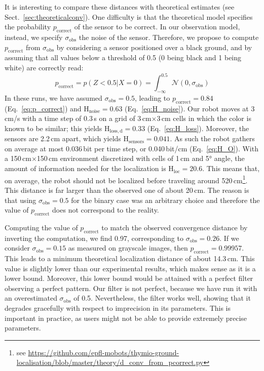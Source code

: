 \documentclass{svmult}
\newcommand{\sect}[1]{Sect.~\ref{sec:#1}}
\newcommand{\eq}[1]{Eq.~\ref{eq:#1}}
\newcommand{\ent}[1]{\mathrm{H}_\mathrm{#1}} %
\begin{document}
It is interesting to compare these distances with theoretical estimates (see \sect{theoreticalconv}).
One difficulty is that the theoretical model specifies the probability $p_\mathrm{correct}$ of the sensor to be correct.
In our observation model, instead, we specify $\sigma_\mathrm{obs}$ the noise of the sensor.
Therefore, we propose to compute $p_\mathrm{correct}$ from $\sigma_\mathrm{obs}$ by considering a sensor positioned over a black ground, and by assuming that all values below a threshold of 0.5 (0 being black and 1 being white) are correctly read:
\begin{equation} \label{eq:p_correct}
p_\mathrm{correct} = p(Z<0.5|X=0) = \int_{-\infty}^{0.5} \mathcal{N}(0, \sigma_\mathrm{obs})
\end{equation}
In these runs, we have assumed $\sigma_\mathrm{obs} = 0.5$, leading to $p_\mathrm{correct}=0.84$ (\eq{p_correct}) and $\ent{noise}=0.63$ (\eq{H_noise}).
Our robot moves at 3\,cm/s with a time step of 0.3\,s on a grid of 3\,cm$\times$3\,cm cells in which the color is known to be similar; this yields $\ent{loss,d}=0.33$ (\eq{H_loss}).
Moreover, the sensors are 2.2\,cm apart, which yields $\ent{sensors}=0.041$.
As such the robot gathers on average at most 0.036\,bit per time step, or 0.040\,bit/cm (\eq{H_O}).
With a 150\,cm$\times$150\,cm environment discretized with cells of 1\,cm and 5° angle, the amount of information needed for the localization is $\ent{loc}=20.6$.
This means that, on average, the robot should not be localized before traveling around 520\,cm\footnote{see \url{https://github.com/epfl-mobots/thymio-ground-localisation/blob/master/theory/d_conv_from_pcorrect.py}}.
This distance is far larger than the observed one of about 20\,cm.
The reason is that using $\sigma_\mathrm{obs} = 0.5$ for the binary case was an arbitrary choice and therefore the value of  $p_\mathrm{correct}$ does not correspond to the reality.

Computing the value of $p_\mathrm{correct}$ to match the observed convergence distance by inverting the computation, we find 0.97, corresponding to $\sigma_\mathrm{obs} = 0.26$.
If we consider $\sigma_\mathrm{obs} = 0.15$ as measured on grayscale images, then $p_\mathrm{correct} = 0.99957$.
This leads to a minimum theoretical localization distance of about 14.3\,cm.
This value is slightly lower than our experimental results, which makes sense as it is a lower bound.
Moreover, this lower bound would be attained with a perfect filter observing a perfect pattern.
Our filter is not perfect, because we have run it with an overestimated $\sigma_\mathrm{obs}$ of 0.5.
Nevertheless, the filter works well, showing that it degrades gracefully with respect to imprecision in its parameters.
This is important in practice, as users might not be able to provide extremely precise parameters.
\end{document}
